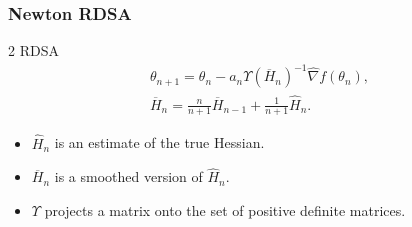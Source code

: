 \begin{frame}
\begin{small}
\frametitle{\centering  Newton RDSA}
\begin{block}{2 RDSA}
\begin{align}
\label{eq:2rdsa}
\theta_{n+1} = \theta_n - a_n \Upsilon(\overline H_n)^{-1}\widehat\nabla f(\theta_n), \\
\overline H_n = \frac{n}{n+1} \overline H_{n-1} + \frac{1}{n+1} \widehat H_n.\label{eq:2rdsa-H}
\end{align}
\begin{itemize}
 \item $\widehat H_n$ is an estimate of the true Hessian. 
 \item $\overline H_n$ is a smoothed version of $\widehat H_n$. 
 \item $\Upsilon$ projects a matrix onto the set of positive definite matrices. 
\end{itemize}

\end{block}
\end{small}
\end{frame}


